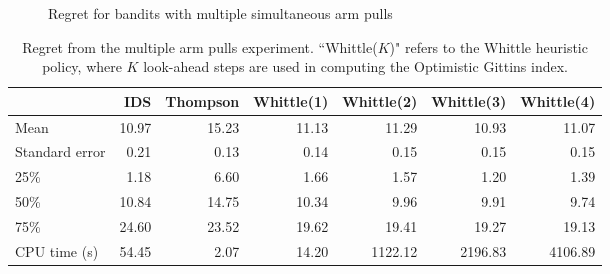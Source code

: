 \begin{figure}
	\centering
	
	\caption{Regret for bandits with multiple simultaneous arm pulls}
	\label{fig:restless1}
\end{figure}

\begin{table}
	\centering
	
	{\color{blue}
	\begin{tabular}{lrrrrrr}
		\toprule
		{} &    IDS &  Thompson &  Whittle(1) &  Whittle(2) &  Whittle(3) &  Whittle(4) \\
		\midrule
		Mean           &  10.97 &     15.23 &       11.13 &       11.29 &       10.93 &       11.07 \\
		Standard error &   0.21 &      0.13 &        0.14 &        0.15 &        0.15 &        0.15 \\
		25\%            &   1.18 &      6.60 &        1.66 &        1.57 &        1.20 &        1.39 \\
		50\%            &  10.84 &     14.75 &       10.34 &        9.96 &        9.91 &        9.74 \\
		75\%            &  24.60 &     23.52 &       19.62 &       19.41 &       19.27 &       19.13 \\
		CPU time (s)   & 54.45 &      2.07 &       14.20 &     1122.12 &     2196.83 &     4106.89 \\
		\bottomrule
	\end{tabular}
	}
	\caption{Regret from the multiple arm pulls experiment. ``Whittle($K$)" refers to the Whittle heuristic policy, where $K$ look-ahead steps are used in computing the Optimistic Gittins index.}
	\label{table:restless1_summary}

	
\end{table}

